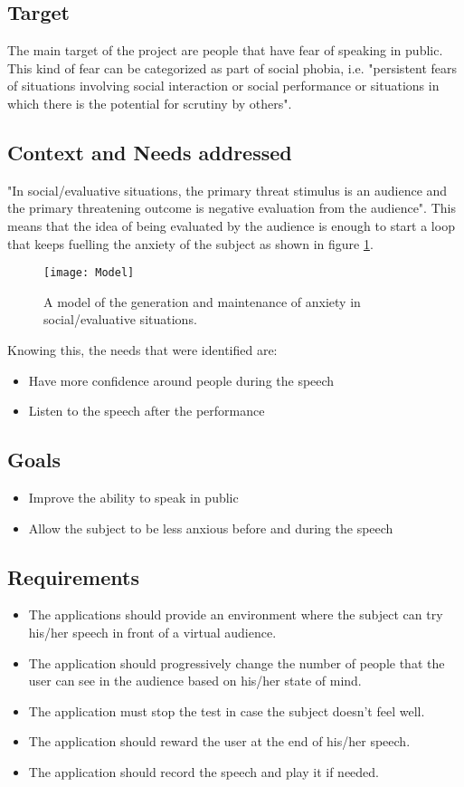 \subsection{Target}
The main target of the project are people that have fear of speaking in public. This kind of fear can be categorized as part of social phobia, i.e. "persistent fears of situations involving social interaction or social performance or situations in which there is the potential for scrutiny by others"\cite{model}.

\subsection{Context and Needs addressed}
"In social/evaluative situations, the primary threat stimulus is an audience and the primary threatening outcome is negative evaluation from the audience"\cite{model}.
This means that the idea of being evaluated by the audience is enough to start a loop that keeps fuelling the anxiety of the subject as shown in figure \ref{fig:model}.
\begin{figure}[H]
	\centering
	\texttt{[image: Model]}
	\caption{A model of the generation and maintenance of anxiety in social/evaluative situations\cite{model}.}\label{fig:model}
\end{figure}

Knowing this, the needs that were identified are:
\begin{itemize}
	\item Have more confidence around people during the speech
	\item Listen to the speech after the performance
\end{itemize}

\subsection{Goals}
\begin{itemize}
	\item Improve the ability to speak in public
	\item Allow the subject to be less anxious before and during the speech
\end{itemize}

\subsection{Requirements}

\begin{itemize}
	\item The applications should provide an environment where the subject can try his/her speech in front of a virtual audience.
	\item The application should progressively change the number of people that the user can see in the audience based on his/her state of mind.
	\item The application must stop the test in case the subject doesn't feel well.
	\item The application should reward the user at the end of his/her speech.
	\item The application should record the speech and play it if needed.
\end{itemize}

